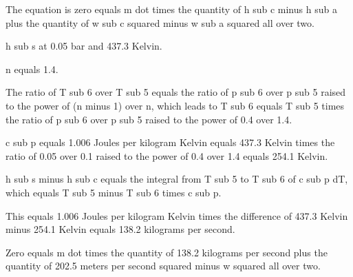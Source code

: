 The equation is zero equals m dot times the quantity of h sub c minus h sub a plus the quantity of w sub c squared minus w sub a squared all over two.

h sub s at 0.05 bar and 437.3 Kelvin.

n equals 1.4.

The ratio of T sub 6 over T sub 5 equals the ratio of p sub 6 over p sub 5 raised to the power of (n minus 1) over n, which leads to T sub 6 equals T sub 5 times the ratio of p sub 6 over p sub 5 raised to the power of 0.4 over 1.4.

c sub p equals 1.006 Joules per kilogram Kelvin equals 437.3 Kelvin times the ratio of 0.05 over 0.1 raised to the power of 0.4 over 1.4 equals 254.1 Kelvin.

h sub s minus h sub c equals the integral from T sub 5 to T sub 6 of c sub p dT, which equals T sub 5 minus T sub 6 times c sub p.

This equals 1.006 Joules per kilogram Kelvin times the difference of 437.3 Kelvin minus 254.1 Kelvin equals 138.2 kilograms per second.

Zero equals m dot times the quantity of 138.2 kilograms per second plus the quantity of 202.5 meters per second squared minus w squared all over two.